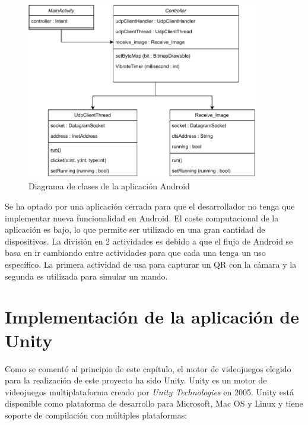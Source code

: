 \begin{figure}[h]

\centering
\includegraphics[width=0.9\textwidth]{./Imagenes/Vectorial/Arquitectura_App_Android.pdf}
\caption{Diagrama de clases de la aplicaci\'on Android}
\end{figure}

Se ha optado por una aplicaci\'on cerrada para que el desarrollador no tenga que implementar nueva funcionalidad en Android. El coste computacional de la aplicaci\'on es bajo, lo que permite ser utilizado en una gran cantidad de dispositivos. La divisi\'on en 2 actividades es debido a que el flujo de Android se basa en ir cambiando entre actividades para que cada una tenga un uso espec\'ifico. La primera actividad de usa para capturar un QR con la c\'amara y la segunda es utilizada para simular un mando.

\section{Implementaci\'on de la aplicaci\'on de Unity}
\label{unity}

Como se coment\'o al principio de este cap\'itulo, el motor de videojuegos elegido para la realizaci\'on de este proyecto ha sido Unity. Unity es un motor de videojuegos multiplataforma creado por \textit{Unity Technologies} en 2005. Unity est\'a disponible como plataforma de desarrollo para Microsoft, Mac OS y Linux y tiene soporte de compilaci\'on con m\'ultiples plataformas:

